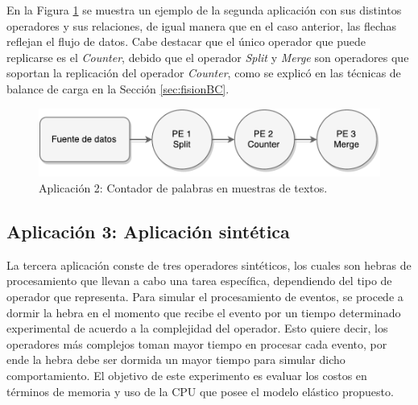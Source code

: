 En la Figura \ref{fig:segundaAplicacion} se muestra un ejemplo de la segunda aplicación con sus distintos operadores y sus relaciones, de igual manera que en el caso anterior, las flechas reflejan el flujo de datos. Cabe destacar que el único operador que puede replicarse es el \textit{Counter}, debido que el operador \textit{Split} y \textit{Merge} son operadores que soportan la replicación del operador \textit{Counter}, como se explicó en las técnicas de balance de carga en la Sección \ref{sec:fisionBC}.

\begin{figure}[!ht]
	\centering
		\includegraphics[scale=0.6]{images/App2.pdf}
	\caption{Aplicación 2: Contador de palabras en muestras de textos.}
	\label{fig:segundaAplicacion}
\end{figure}

\subsection{Aplicación 3: Aplicación sintética}

La tercera aplicación conste de tres operadores sintéticos, los cuales son hebras de procesamiento que llevan a cabo una tarea específica, dependiendo del tipo de operador que representa. Para simular el procesamiento de eventos, se procede a dormir la hebra en el momento que recibe el evento por un tiempo determinado experimental de acuerdo a la complejidad del operador. Esto quiere decir, los operadores más complejos toman mayor tiempo en procesar cada evento, por ende la hebra debe ser dormida un mayor tiempo para simular dicho comportamiento. El objetivo de este experimento es evaluar los costos en términos de memoria y uso de la CPU que posee el modelo elástico propuesto.


